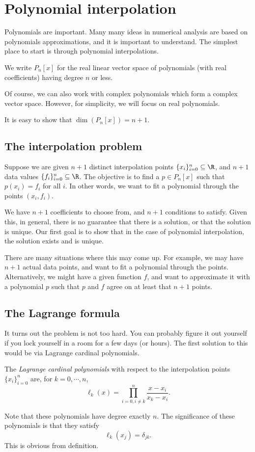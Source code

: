 \documentclass[a4paper]{article}
\begin{document}
\section{Polynomial interpolation}
Polynomials are important. Many many ideas in numerical analysis are based on polynomials approximations, and it is important to understand. The simplest place to start is through polynomial interpolations.

\begin{notation}
  We write $P_n[x]$ for the real linear vector space of polynomials (with real coefficients) having degree $n$ or less.
\end{notation}
Of course, we can also work with complex polynomials which form a complex vector space. However, for simplicity, we will focus on real polynomials.

It is easy to show that $\dim (P_n[x]) = n + 1$.

\subsection{The interpolation problem}
Suppose we are given $n + 1$ distinct interpolation points $\{x_i\}_{i = 0}^n \subseteq \R$, and $n + 1$ data values $\{f_i\}_{i = 0}^n \subseteq \R$. The objective is to find a $p \in P_n[x]$ such that $p(x_i) = f_i$ for all $i$. In other words, we want to fit a polynomial through the points $(x_i, f_i)$.

We have $n + 1$ coefficients to choose from, and $n + 1$ conditions to satisfy. Given this, in general, there is no guarantee that there is a solution, or that the solution is unique. Our first goal is to show that in the case of polynomial interpolation, the solution exists and is unique.

There are many situations where this may come up. For example, we may have $n + 1$ actual data points, and want to fit a polynomial through the points. Alternatively, we might have a given function $f$, and want to approximate it with a polynomial $p$ such that $p$ and $f$ agree on at least that $n + 1$ points.

\subsection{The Lagrange formula}
It turns out the problem is not too hard. You can probably figure it out yourself if you lock yourself in a room for a few days (or hours). The first solution to this would be via Lagrange cardinal polynomials.
\begin{defi}
  The \emph{Lagrange cardinal polynomials} with respect to the interpolation points $\{x_i\}_{i = 0}^n$ are, for $k = 0, \cdots, n$,
  \[
    \ell_k (x) = \prod_{i = 0, i \not= k}^n \frac{x - x_i}{x_k - x_i}.
  \]
\end{defi}
Note that these polynomials have degree exactly $n$. The significance of these polynomials is that they satisfy
\[
  \ell_k(x_j) = \delta_{jk}.
\]
This is obvious from definition.
\end{document}

